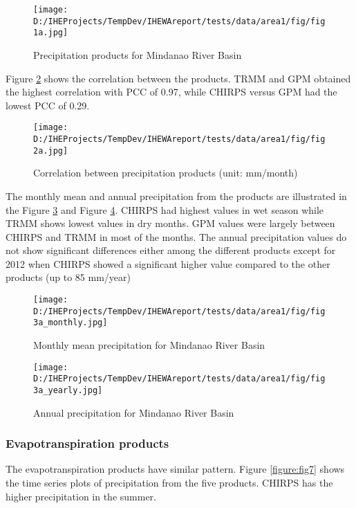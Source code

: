 \documentclass[oneside,openany]{article}%
\begin{document}
\begin{figure}[H]%
\centering%
\texttt{[image: D:/IHEProjects/TempDev/IHEWAreport/tests/data/area1/fig/fig1a.jpg]}%
\caption{Precipitation products for Mindanao River Basin}%
\label{figure:fig3}%
\end{figure}

%
Figure \ref{figure:fig4} shows the correlation between the products. TRMM and GPM obtained the highest correlation with PCC of 0.97, while CHIRPS versus GPM had the lowest PCC of 0.29.%
\linebreak%


\begin{figure}[H]%
\centering%
\texttt{[image: D:/IHEProjects/TempDev/IHEWAreport/tests/data/area1/fig/fig2a.jpg]}%
\caption{Correlation between precipitation products (unit: mm/month)}%
\label{figure:fig4}%
\end{figure}

%
The monthly mean and annual precipitation from the products are illustrated in the Figure \ref{figure:fig5} and Figure \ref{figure:fig6}. CHIRPS had highest values in wet season while TRMM shows lowest values in dry months. GPM values were largely between CHIRPS and TRMM in most of the months. The annual precipitation values do not show significant differences either among the different products except for 2012 when CHIRPS showed a significant higher value compared to the other products (up to 85 mm/year)%
\linebreak%


\begin{figure}[H]%
\centering%
\texttt{[image: D:/IHEProjects/TempDev/IHEWAreport/tests/data/area1/fig/fig3a\_monthly.jpg]}%
\caption{Monthly mean precipitation for Mindanao River Basin}%
\label{figure:fig5}%
\end{figure}

%


\begin{figure}[H]%
\centering%
\texttt{[image: D:/IHEProjects/TempDev/IHEWAreport/tests/data/area1/fig/fig3a\_yearly.jpg]}%
\caption{Annual precipitation for Mindanao River Basin}%
\label{figure:fig6}%
\end{figure}

%
\subsubsection{Evapotranspiration products}%
\label{ssubsec:Evapotranspirationproducts}%
The evapotranspiration products have similar pattern. Figure \ref{figure:fig7} shows the time series plots of precipitation from the five products. CHIRPS has the higher precipitation in the summer.%
\linebreak%
\end{document}
